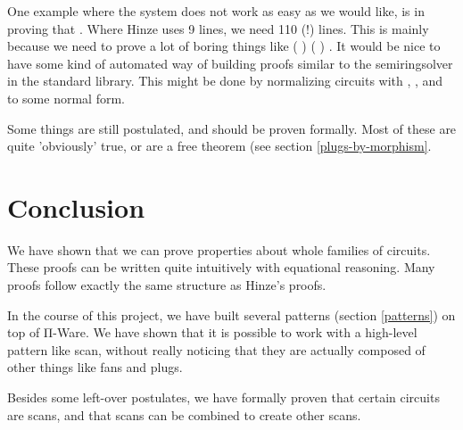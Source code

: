 One example where the system does not work as easy as we would like,
is in proving that  \AY{(}  
 \AF{⟫[}  \AF{]} \AY{)}  
   .
Where Hinze uses 9 lines, we need 110 (!) lines.
This is mainly because we need to prove a lot of boring things like
    (  )  
 (  )  .
It would be nice to have some kind of automated way of building
proofs similar to the semiringsolver in the standard library.
This might be done by normalizing circuits with , ,
 and  to some normal form.

Some things are still postulated, and should be proven formally.
Most of these are quite 'obviously' true, or are a free theorem (see
section \ref{plugs-by-morphism}.

\section{Conclusion}\label{conclusion}

We have shown that we can prove properties about whole families of
circuits.
These proofs can be written quite intuitively with equational
reasoning.
Many proofs follow exactly the same structure as Hinze's proofs.

In the course of this project, we have built several patterns (section
\ref{patterns}) on top of Π-Ware.
We have shown that it is possible to work with a high-level pattern
like scan, without really noticing that they are actually composed of
other things like fans and plugs.

Besides some left-over postulates, we have formally proven that certain
circuits are scans, and that scans can be combined to create other
scans.
